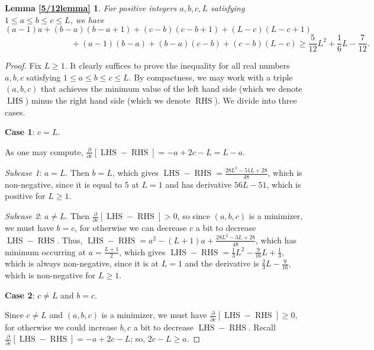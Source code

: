 \documentclass[12pt]{amsart}
\newtheorem*{lemma-repeat}{Lemma \ref{5/12lemma}}
\theoremstyle{definition}
\newcommand{\tb}{\textbf}
\newcommand{\vs}{\vspace{3mm}}
\newcommand{\vsss}{\vspace{6mm}}
\DeclareMathOperator{\LHS}{LHS}
\DeclareMathOperator{\RHS}{RHS}
\begin{document}
\vspace{1mm}

\begin{lemma-repeat}
For positive integers $a,b,c,L$ satisfying $1 \le a \le b \le c \le L$, we have  $$(a-1)a+(b-a)(b-a+1)+(c-b)(c-b+1)+(L-c)(L-c+1) \qquad \qquad$$ $$\qquad \qquad \qquad \qquad +(a-1)(b-a)+(b-a)(c-b)+(c-b)(L-c) \ge \frac{5}{12}L^2+\frac{1}{6}L-\frac{7}{12}.$$
\end{lemma-repeat}

\begin{proof}
Fix $L \ge 1$. It clearly suffices to prove the inequality for all real numbers $a,b,c$ satisfying $1 \le a \le b \le c \le L$. By compactness, we may work with a triple $(a,b,c)$ that achieves the minimum value of the left hand side (which we denote $\LHS$) minus the right hand side (which we denote $\RHS$). We divide into three cases. 

\vs


\tb{Case 1}: $c=L$. 

\vspace{1.5mm}

As one may compute, $\frac{\partial}{\partial c}[\LHS-\RHS] = -a+2c-L = L-a$. 

\vspace{1.5mm}

\textit{Subcase 1}: $a=L$. Then $b=L$, which gives $\LHS-\RHS = \frac{28L^2-51L+28}{48}$, which is non-negative, since it is equal to $5$ at $L=1$ and has derivative $56L-51$, which is positive for $L \ge 1$.

\vspace{1.5mm}

\textit{Subcase 2}: $a \not = L$. Then $\frac{\partial}{\partial c}[\LHS-\RHS] > 0$, so since $(a,b,c)$ is a minimizer, we must have $b=c$, for otherwise we can decrease $c$ a bit to decrease $\LHS-\RHS$. Thus, $\LHS-\RHS = a^2-(L+1)a+\frac{28L^2-3L+28}{48}$, which has minimum occurring at $a = \frac{L+1}{2}$, which gives $\LHS-\RHS = \frac{1}{3}L^2-\frac{9}{16}L+\frac{1}{3}$, which is always non-negative, since it is at $L=1$ and the derivative is $\frac{2}{3}L-\frac{9}{16}$, which is non-negative for $L \ge 1$.

\vsss

\tb{Case 2}: $c \not = L$ and $b = c$.

\vspace{1.5mm}

Since $c \not = L$ and $(a,b,c)$ is a minimizer, we must have $\frac{\partial}{\partial c}[\LHS-\RHS] \ge 0$, for otherwise we could increase $b,c$ a bit to decrease $\LHS-\RHS$. Recall $\frac{\partial}{\partial c}[\LHS-\RHS] = -a+2c-L$; so, $2c-L \ge a$.


\end{proof}
\end{document}
